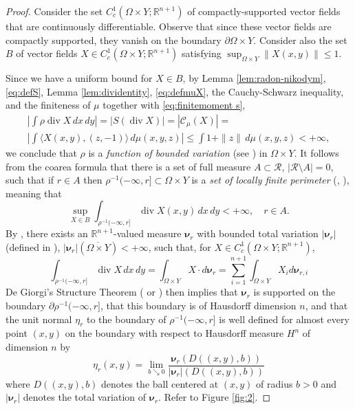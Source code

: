 \documentclass{article}
\newcommand{\R}{\mathbb{R}}
\theoremstyle{definition}
\theoremstyle{remark}
\begin{document}
\begin{proof}
 
 
 Consider the set $C^1_c(\Omega\times Y;\R^{n+1})$ of compactly-supported vector fields that are continuously differentiable. Observe that since these vector fields are compactly supported, they vanish on the boundary $\partial\Omega\times Y$.
 Consider also the set $B$ of vector fields $X\in C^1_c(\Omega\times Y;\R^{n+1})$ satisfying $\sup_{\Omega\times Y}\|X(x,y)\|\leq 1$.  

 
 Since we have a uniform bound %
 for $X\in B$, by Lemma \ref{lem:radon-nikodym}, \eqref{eq:defS}, Lemma \ref{lem:dividentity}, \eqref{eq:defmuX}, the Cauchy-Schwarz inequality, and the finiteness of $\mu$ together with \eqref{eq:finitemoment s},  
 \begin{multline*}
%
\left|
 \int \rho\operatorname{div} X\,dx\,dy\right|
  =| S(\operatorname{div}X)|=|{\mathcal C_\mu}(X)|=\\
  \left|\int \langle X(x,y),(z,-1)\rangle\,d\mu(x,y,z)\right|
  \leq \int 1+\|z\|\,d\mu(x,y,z)<+\infty,
 \end{multline*}
 we conclude that $\rho$ is a \emph{function of bounded variation} (see \cite[Def. 5.1]{evansgariepy}) in $\Omega\times Y$.
It follows from the coarea formula \cite[Thm. 5.9]{evansgariepy} that there is a set of full measure $A\subset {\mathcal R}$, $|{\mathcal R}\setminus A|=0$, such that if $r\in A$ then $\rho^{-1}(-\infty,r]\subset \Omega\times Y$ is a \emph{set of locally finite perimeter} (\cite[Def. 5.1]{evansgariepy}, \cite[Ch. 12]{maggi2012sets}), meaning that 
 \[\sup_{X\in B}\int_{\rho^{-1}(-\infty,r]}\operatorname{div}X(x,y)\,dx\,dy<+\infty, \quad r\in A.\]
%
By \cite[Prop. 12.1]{maggi2012sets}, there exists an $\R^{n+1}$-valued measure $\bm\nu_r$ with bounded total variation $|{\bm\nu}_r|$ (defined in \cite[Rmk. 4.12]{maggi2012sets}), $|{\bm\nu}_r|(\overline{\Omega\times Y})<+\infty$,  such that, for $X\in C^1_c(\Omega\times Y;\R^{n+1})$,
 \[\int_{\rho^{-1}(-\infty,r]}\operatorname{div}X\,dx\,dy=\int_{\Omega\times Y}X\cdot d{\bm\nu}_r  = \sum_{i=1}^{n+1} \int_{\Omega\times Y} X_i d{\bm\nu}_{r,i}\]
%
 De Giorgi's Structure Theorem (\cite[Th. 5.15 and 5.16]{evansgariepy} or \cite[Th. 15.9]{maggi2012sets}) then implies that ${\bm\nu}_r$ is supported on the boundary $\partial \rho^{-1}(-\infty,r]$, that this boundary is of Hausdorff dimension $n$, and that the unit normal $\eta_r$ to the boundary of $\rho^{-1}(-\infty,r]$ is well defined for almost every point $(x,y)$ on the boundary with respect to Hausdorff measure $H^n$ of dimension $n$ by
 \begin{equation}\label{eq:defeta}
  \eta_r(x,y)=\lim_{b\searrow 0}\frac{{\bm\nu}_r(D((x,y),b))}{|{\bm\nu}_r|(D((x,y),b))}
 \end{equation}
 where $D((x,y),b)$ denotes the ball centered at $(x,y)$ of radius $b>0$ and $|{\bm\nu}_r|$ denotes the total variation of ${\bm\nu}_r$. Refer to Figure \ref{fig:2}.
 

\end{proof}
\end{document}
